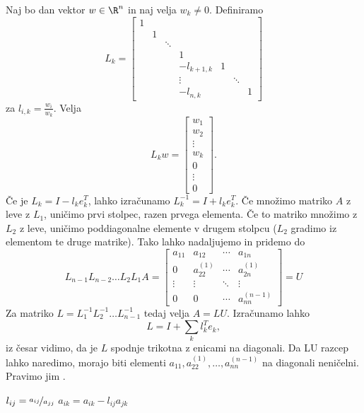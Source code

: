Naj bo dan vektor $w \in \R^n$ in naj velja $w_k \ne 0$.
Definiramo 
\[
  L_k =
  \begin{bmatrix}
	1 &   &        &           &        &        & \\
	  & 1 &        &           &        &        & \\
	  &   & \ddots &           &        &        & \\
	  &   &        & 1         &        &        & \\
	  &   &        & -l_{k+1,k} & 1 &        & \\
	  &   &        & \vdots    &        & \ddots &  \\
	  &   &        & -l_{n,k}  &         &        & 1
  \end{bmatrix}
\]
za $l_{i,k} = \frac{w_i}{w_k}$.
Velja
\[
  L_k w =
  \begin{bmatrix}
	w_1 \\ w_2 \\ \vdots \\ w_k \\ 0 \\ \vdots \\ 0
  \end{bmatrix}.
\]
Če je $L_k = I - l_k e_k^T$, lahko izračunamo $L_k^{-1} = I + l_k e_k^T$.
Če množimo matriko $A$ z leve z $L_1$, uničimo prvi stolpec, razen prvega
elementa.
Če to matriko množimo z $L_2$ z leve, uničimo poddiagonalne elemente v drugem
stolpcu ($L_2$ gradimo iz elementom te druge matrike).
Tako lahko nadaljujemo in pridemo do
\[
  L_{n-1} L_{n-2} \ldots L_2 L_1 A =
  \begin{bmatrix}
	a_{11} & a_{12} & \cdots & a_{1n} \\
	0 & a_{22}^{(1)} & \cdots & a_{2n}^{(1)} \\
	\vdots & \vdots & \ddots & \vdots \\
	0 & 0 & \cdots & a_{nn}^{(n-1)}
  \end{bmatrix}
  = U
\]
Za matriko $L = L_1^{-1} L_2^{-1} \ldots L_{n-1}^{-1}$ tedaj velja $A = LU$.
Izračunamo lahko
\[
  L = I + \sum_k l_k^T e_k,
\]
iz česar vidimo, da je $L$ spodnje trikotna z enicami na diagonali.
Da LU razcep lahko naredimo, morajo biti elementi $a_{11}, a_{22}^{(1)}, \ldots,
a_{nn}^{(n-1)}$ na diagonali neničelni.
Pravimo jim .


\begin{algorithm}
  \caption{LU razcep brez pivotiranja}%
  \label{alg:lubrezpivotiranja}
  \begin{algorithmic}
	\State $l_{ij} = \nicefrac{a_{ij}}{a_{jj}}$
	\State $a_{ik} = a_{ik} - l_{ij} a_{jk}$
	\EndFor
	\EndFor
	\EndFor
  \end{algorithmic}
\end{algorithm}

